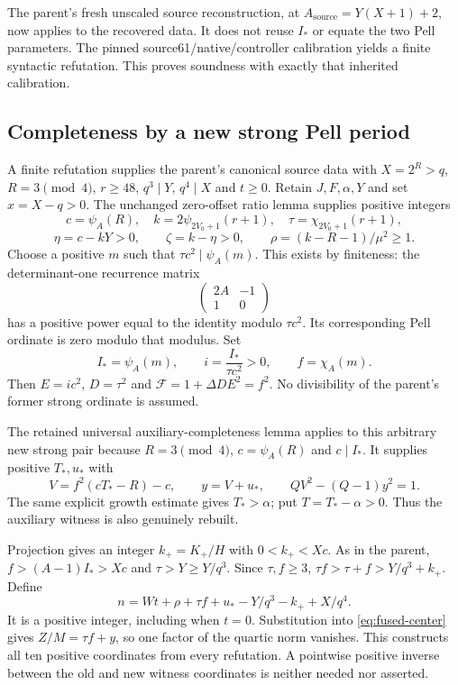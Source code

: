 The parent's fresh unscaled source reconstruction, at
$A_{\mathrm{source}}=Y(X+1)+2$, now applies to the recovered data.
It does not reuse $I_*$ or equate the two Pell parameters. The pinned
source61/native/controller calibration yields a finite syntactic
refutation. This proves soundness with exactly that inherited calibration.

\subsection{Completeness by a new strong Pell period}
A finite refutation supplies the parent's canonical source data with
$X=2^R>q$, $R=3\pmod4$, $r\ge48$, $q^3\mid Y$, $q^4\mid X$ and
$t\ge0$. Retain $J,F,\alpha,Y$ and set $x=X-q>0$. The unchanged
zero-offset ratio lemma supplies positive integers
\[
 c=\psi_A(R),\quad k=2\psi_{2V_0+1}(r+1),\quad
 \tau=\chi_{2V_0+1}(r+1),
\]
\[
 \eta=c-kY>0,\qquad\zeta=k-\eta>0,\qquad
 \rho=(k-R-1)/\mu^2\ge1.
\]
Choose a positive $m$ such that $\tau c^2\mid\psi_A(m)$. This exists
by finiteness: the determinant-one recurrence matrix
\[
          \begin{pmatrix}2A&-1\\1&0\end{pmatrix}
\]
has a positive power equal to the identity modulo $\tau c^2$. Its
corresponding Pell ordinate is zero modulo that modulus. Set
\[
 I_*=\psi_A(m),\qquad i=\frac{I_*}{\tau c^2}>0,
          \qquad f=\chi_A(m).
\]
Then $E=ic^2$, $D=\tau^2$ and
$\mathcal F=1+\Delta DE^2=f^2$. No divisibility of the parent's
former strong ordinate is assumed.

The retained universal auxiliary-completeness lemma applies to this
arbitrary new strong pair because $R=3\pmod4$, $c=\psi_A(R)$ and
$c\mid I_*$. It supplies positive $T_*,u_*$ with
\[
 V=f^2(cT_*-R)-c,\qquad y=V+u_*,\qquad QV^2-(Q-1)y^2=1.
\]
The same explicit growth estimate gives $T_*>\alpha$; put
$T=T_*-\alpha>0$. Thus the auxiliary witness is also genuinely rebuilt.

Projection gives an integer $k_+=K_+/H$ with $0<k_+<Xc$.
As in the parent, $f>(A-1)I_*>Xc$ and $\tau>Y\ge Y/q^3$.
Since $\tau,f\ge3$, $\tau f>\tau+f>Y/q^3+k_+$. Define
\[
 n=Wt+\rho+\tau f+u_*-Y/q^3-k_++X/q^4.
\]
It is a positive integer, including when $t=0$. Substitution into
\eqref{eq:fused-center} gives $Z/M=\tau f+y$, so one factor of the
quartic norm vanishes. This constructs all ten positive coordinates
from every refutation. A pointwise positive inverse between the old
and new witness coordinates is neither needed nor asserted.

